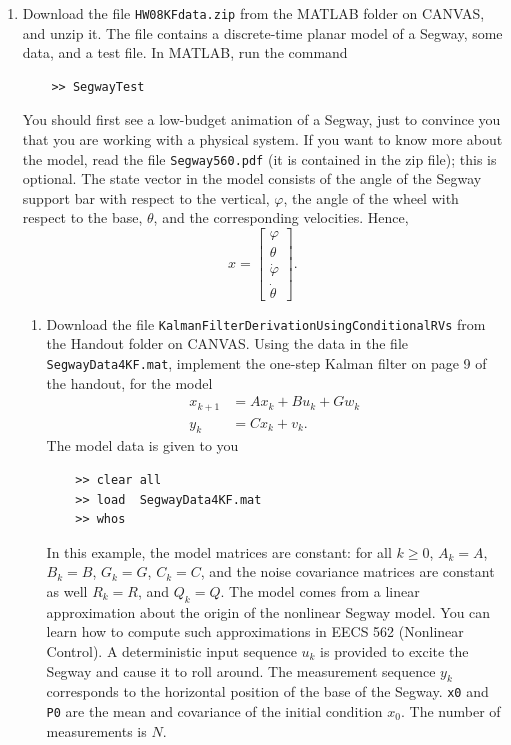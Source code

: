 \documentclass[letterpaper]{article}
\begin{document}
\begin{enumerate}
\item Download the file \texttt{HW08KFdata.zip} from the MATLAB folder on CANVAS, and unzip it. The file contains a discrete-time planar model of a Segway, some data, and a test file. In MATLAB, run the command
    \begin{verbatim}
    >> SegwayTest
    \end{verbatim}
    You should first see a low-budget animation of a Segway, just to convince you that you are working with a physical system. If you want to know more about the model, read the file \texttt{Segway560.pdf} (it is contained in the zip file);  this is optional. The state vector in the model consists of the angle of the Segway support bar with respect to the vertical, $\varphi$, the angle of the wheel with respect to the base, $\theta$, and the corresponding velocities. Hence,
    $$x=\left[\begin{array}{c} \varphi \\  \theta \\  \dot{\varphi}\\  \dot{\theta}\end{array} \right]. $$
     \begin{enumerate}
\setlength{\itemsep}{.1in}
\renewcommand{\labelenumi}{(\alph{enumi})}


\item Download the file \texttt{KalmanFilterDerivationUsingConditionalRVs} from the Handout folder on CANVAS.
    Using the data in the file \texttt{SegwayData4KF.mat}, implement the one-step Kalman filter on page 9 of the handout, for the model
     \begin{align*}
x_{k+1} &= A x_k + B u_k + G w_k \\
y_k &= C x_k + v_k.
\end{align*}
The model data is given to you
    \begin{verbatim}
    >> clear all
    >> load  SegwayData4KF.mat
    >> whos
    \end{verbatim}
     In this example, the model matrices are constant: for all $k\ge 0$, $A_k =A$, $B_k=B$, $G_k=G$,  $C_k=C$, and the noise covariance matrices are constant as well $R_k=R$, and $Q_k=Q$. The model comes from a linear approximation about the origin of the nonlinear Segway model. You can learn how to compute such approximations in EECS 562 (Nonlinear Control). A deterministic input sequence $u_{k}$ is provided to excite the Segway and cause it to roll around. The measurement sequence $y_k$ corresponds to the horizontal position of the base of the Segway.  \texttt{x0} and  \texttt{P0}  are the mean and covariance of the initial condition $x_0$. The number of measurements is $N$.


\end{enumerate}
\end{enumerate}
\end{document}
